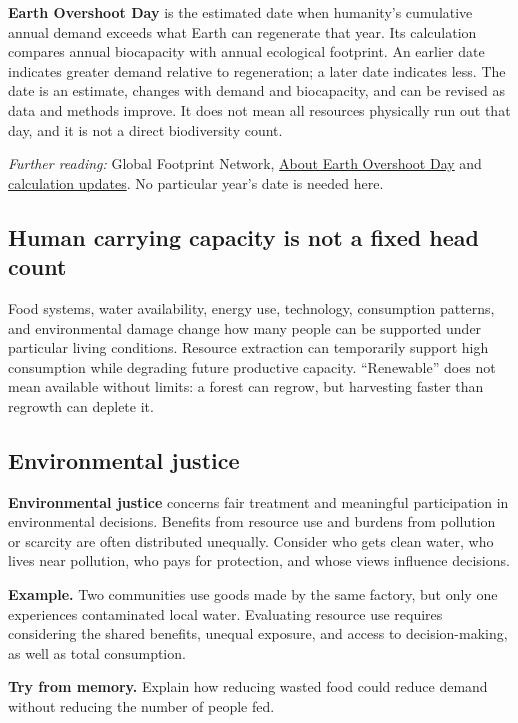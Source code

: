 \documentclass[11pt,letterpaper]{article}
\newcommand{\memorycheck}[1]{\par\smallskip\textbf{Try from memory.} #1\par}
\newcommand{\source}[1]{{\footnotesize\textit{Further reading:} #1\par}}
\begin{document}
\textbf{Earth Overshoot Day} is the estimated date when humanity's cumulative annual demand exceeds what Earth can regenerate that year. Its calculation compares annual biocapacity with annual ecological footprint. An earlier date indicates greater demand relative to regeneration; a later date indicates less. The date is an estimate, changes with demand and biocapacity, and can be revised as data and methods improve. It does not mean all resources physically run out that day, and it is not a direct biodiversity count.
\source{Global Footprint Network, \href{https://overshoot.footprintnetwork.org/about-earth-overshoot-day/}{About Earth Overshoot Day} and \href{https://footprintnetwork.org/our-work/earth-overshoot-day/}{calculation updates}. No particular year's date is needed here.}
\subsection*{Human carrying capacity is not a fixed head count}
Food systems, water availability, energy use, technology, consumption patterns, and environmental damage change how many people can be supported under particular living conditions. Resource extraction can temporarily support high consumption while degrading future productive capacity. ``Renewable'' does not mean available without limits: a forest can regrow, but harvesting faster than regrowth can deplete it.
\subsection*{Environmental justice}
\textbf{Environmental justice} concerns fair treatment and meaningful participation in environmental decisions. Benefits from resource use and burdens from pollution or scarcity are often distributed unequally. Consider who gets clean water, who lives near pollution, who pays for protection, and whose views influence decisions.

\textbf{Example.} Two communities use goods made by the same factory, but only one experiences contaminated local water. Evaluating resource use requires considering the shared benefits, unequal exposure, and access to decision-making, as well as total consumption.
\begin{center}
\par
\end{center}
\memorycheck{Explain how reducing wasted food could reduce demand without reducing the number of people fed.}
\end{document}
